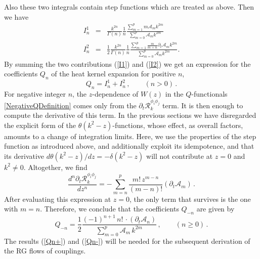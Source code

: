 \documentclass[notitlepage,eqsecnum,bm,amsmath,preprintnumbers,superscriptaddress,nofootinbib,aps,11pt]{revtex4-1}
\def\eq#1{(\ref{#1})}
\begin{document}
Also these two integrals contain step functions which are treated as above.
Then we have
\begin{eqnarray}
I_n^1
&=&
\frac{k^{2n}}{\Gamma(n)}\frac{1}{n}\frac{\sum_{m=1}^{p} m\mathcal{A}_m k^{2m}}{\sum_{m=0}^{p} \mathcal{A}_m k^{2m}} 
\label{I1}\\
\label{I2}
I_n^2&=&\frac12 \frac{k^{2n}}{\Gamma(n)}\frac{1}{n}\frac{\sum_{m=1}^{p}\frac{m}{m+n}\partial_t\mathcal{A}_mk^{2m}}{\sum_{m=0}^{p} \mathcal{A}_m k^{2m}}.
\end{eqnarray}
By summing the two contributions \eq{I1} and \eq{I2}  we get an expression for the coefficients $Q_n$ of the heat kernel expansion for positive $n$, 
\begin{equation}
\label{Qn+}
Q_n=I_n^1+I_n^2
\, ,\qquad (n>0)\,.
\end{equation}
For negative integer $n$, 
the $z$-dependence of $W(z)$ in the $Q$-functionals \eqref{NegativeQDefinition} comes only from the $\partial_t\mathcal{R}_k^{\phi_i\phi_j}$ term. It is then enough to compute 
the derivative of this term. In the previous sections we have disregarded the explicit form of the $\theta(k^2-z)$-functions,
whose effect, as overall factors, amounts to a change of integration limits. 
Here, we use the properties of the step function as introduced above, and additionally exploit 
its idempotence, and that its derivative
$d\theta(k^2-z)/dz=-\delta(k^2-z)$ will not contribute at $z=0$ and $k^2\neq 0$.
Altogether, we find
\begin{equation}
\frac{d^n\partial_t\mathcal{R}_k^{\phi_i\phi_j}}{d z^n}
=
-\sum_{m=n}^{p}\frac{m!\,z^{m-n}}{(m-n)!}(\partial_t\mathcal{A}_m)\,.
\end{equation}
After evaluating this expression at $z=0$, the only term that survives is the one with $m=n$. Therefore, we conclude that the coefficients $Q_{-n}$ are given by 
\begin{equation}\label{Qn-}
Q_{-n}=\frac{1}{2}\frac{(-1)^{n+1}\,n!\,\cdot\left(\partial_t\mathcal{A}_n\right) }{\sum_{m=0}^{p} \mathcal{A}_m \,k^{2m}}\, , \qquad (n\ge0)\,.
\end{equation}
The results \eq{Qn+} and \eq{Qn-} will be needed for the subsequent derivation of the RG flows of couplings.
\end{document}
